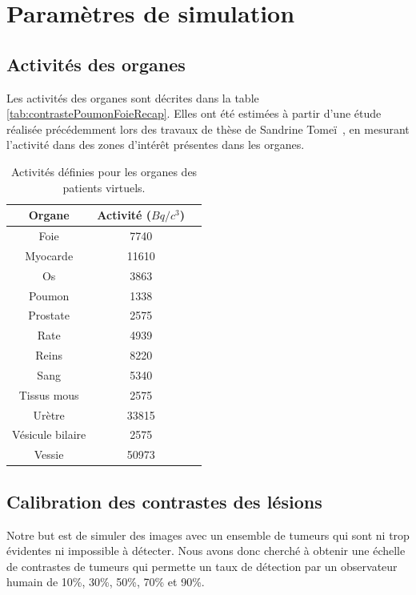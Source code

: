 	\section{Paramètres de simulation}

\subsection{Activités des organes}

Les activités des organes sont décrites dans la table \ref{tab:contrastePoumonFoieRecap}. Elles ont été estimées à partir d'une étude réalisée précédemment lors des travaux de thèse de Sandrine Tomeï~\cite{tomei2008development}, en mesurant l'activité dans des zones d'intérêt présentes dans les organes.

\begin{table}
\centering
 \begin{tabular}{|c|c|c|} 
\hline
Organe 		& Activité ($Bq/c^3$) \\
\hline
\hline
Foie		& 7740		       \\
\hline
Myocarde	& 11610		       \\
\hline
Os		& 3863		       \\
\hline
Poumon 		& 1338 		       \\
\hline
Prostate	& 2575		       \\
\hline
Rate		& 4939		       \\
\hline
Reins		& 8220		       \\
\hline
Sang		& 5340		       \\
\hline
Tissus mous 	& 2575 		       \\
\hline
Urètre		& 33815		       \\
\hline
Vésicule bilaire& 2575		       \\
\hline
Vessie		& 50973		       \\
\hline
 \end{tabular}

\caption[Activités des organes des patients de la base de données]{Activités définies pour les organes des patients virtuels.}
\label{tab:activiteOrganes}
\end{table}

\subsection{Calibration des contrastes des lésions}

Notre but est de simuler des images avec un ensemble de tumeurs qui sont ni trop évidentes ni impossible à détecter. Nous avons donc cherché à obtenir une échelle de contrastes de tumeurs qui permette un taux de détection par un observateur humain de 10\%, 30\%, 50\%, 70\% et 90\%.

